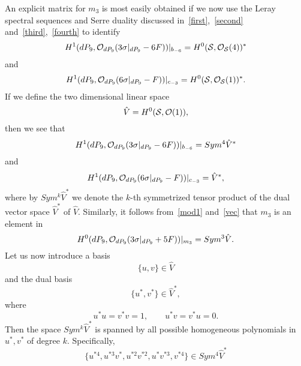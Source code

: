 \documentclass[a4paper,12pt]{article}
\numberwithin{equation}{section}
\theoremstyle{plain}
\begin{document}
%
An explicit matrix for $m_3$ is most easily obtained if we now use the
Leray
spectral sequences and Serre duality discussed
in~\eqref{first},~\eqref{second}
and~\eqref{third},~\eqref{fourth} to identify
%
\begin{equation}
H^{1} (dP_9, {\cal O}_{dP_9} (3 \sigma|_{dP_9} -6F))|_{b_{-6}} =
H^{0} ({\cal S}, {\cal O}_{{\cal S}} (4))^{*}
\label{67}
\end{equation}
%
and
%
\begin{equation}
H^{1} (dP_9, {\cal O}_{dP_9} (6 \sigma|_{dP_9} -F))|_{c_{-3}}=
H^{0} ({\cal S}, {\cal O}_{{\cal S}} (1))^{*}.
\label{68}
\end{equation}
%
If we define the two dimensional linear space
%
\begin{equation}
\hat{V}= H^{0}({\cal S}, {\cal O}(1)),
\label{vec}
\end{equation}
%
then we see that
%
\begin{equation}
H^{1} (dP_9, {\cal O}_{dP_9} (3 \sigma|_{dP_9} -6F))|_{b_{-6}}=
Sym^{4}\hat{V}^{*}
\label{69}
\end{equation}
%
and
%
\begin{equation}
H^{1} (dP_9, {\cal O}_{dP_9} (6 \sigma|_{dP_9} -F))|_{c_{-3}}=
\hat{V}^{*},
\label{70}
\end{equation}
%
where by $Sym^{k}\hat{V}^{*}$ we denote the $k$-th symmetrized tensor
product
of the dual vector space $\hat{V}^{*}$ of $\hat{V}$.
Similarly, it follows from~\eqref{mod1} and~\eqref{vec} that $m_3$
is an element in
%
\begin{equation}
H^{0}(dP_9, {\cal O}_{dP_9} (3 \sigma|_{dP_9} +5F))|_{m_3} =
Sym^{3}\hat{V}.
\label{71}
\end{equation}
%
Let us now introduce a basis
%
\begin{equation}
\{u, v\} \in \hat{V}
\label{72}
\end{equation}
%
and the dual basis
%
\begin{equation}
\{u^{*}, v^{*}\} \in \hat{V}^{*},
\label{73}
\end{equation}
%
where
%
\begin{equation}
u^{*} u =v^{*} v =1, \qquad u^{*}v =v^{*} u =0.
\label{74}
\end{equation}
%
Then the space $Sym^{k}\hat{V}^{*}$ is spanned by all possible homogeneous
polynomials in $u^*, v^{*}$ of degree $k$. Specifically,
%
\begin{equation}
\{u^{*4}, u^{*3}v^{*}, u^{*2}v^{*2}, u^{*}v^{*3}, v^{*4} \}\in
Sym^{4}\hat{V}^{*}
\label{75}
\end{equation}
\end{document}
